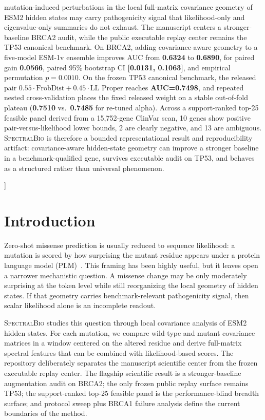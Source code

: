 \documentclass[10pt,twocolumn,letterpaper]{article}
\newcommand{\methodname}{\textsc{SpectralBio}}
\begin{document}
{\begin{center}
{mutation-induced perturbations in the local full-matrix covariance geometry of
ESM2 hidden states may carry pathogenicity signal that likelihood-only and
eigenvalue-only summaries do not exhaust. The manuscript centers a stronger-baseline
BRCA2 audit, while the public executable replay center remains the TP53 canonical
benchmark. On BRCA2, adding covariance-aware geometry to a five-model ESM-1v
ensemble improves AUC from \textbf{0.6324} to \textbf{0.6890}, for paired gain
\textbf{0.0566}, paired 95\% bootstrap CI \textbf{[0.0131, 0.1063]}, and
 empirical permutation \textbf{$p=0.0010$}. On the frozen TP53 canonical benchmark,
 the released pair \textbf{$0.55\cdot\text{FrobDist}+0.45\cdot\text{LL Proper}$}
 reaches \textbf{AUC=0.7498}, and repeated nested cross-validation places the fixed
 released weight on a stable out-of-fold plateau (\textbf{0.7510} vs.\ \textbf{0.7485}
 for re-tuned alpha). Across a support-ranked top-25 feasible panel derived from a
 15,752-gene ClinVar scan, 10 genes show positive pair-versus-likelihood lower bounds,
 2 are clearly negative, and 13 are ambiguous. \methodname{} is therefore a
 bounded representational result and reproducibility artifact: covariance-aware
 hidden-state geometry can improve a stronger baseline in a benchmark-qualified gene,
 survives executable audit on TP53, and behaves as a structured rather than universal
 phenomenon.%
}
\end{center}
\vspace{4pt}%
}]%

\section{Introduction}

Zero-shot missense prediction is usually reduced to sequence likelihood:
a mutation is scored by how surprising the mutant residue appears under a protein
language model (PLM)~\cite{meier2021language}. This framing has been highly useful,
but it leaves open a narrower mechanistic question. A missense change may be only
moderately surprising at the token level while still reorganizing the local geometry
of hidden states. If that geometry carries benchmark-relevant pathogenicity signal,
then scalar likelihood alone is an incomplete readout.

\methodname{} studies this question through local covariance analysis of ESM2 hidden
states. For each mutation, we compare wild-type and mutant covariance matrices in a
window centered on the altered residue and derive full-matrix spectral features that
can be combined with likelihood-based scores. The repository deliberately separates
the manuscript scientific center from the frozen executable replay center. The
flagship scientific result is a stronger-baseline augmentation audit on BRCA2; the
only frozen public replay surface remains TP53; the support-ranked top-25 feasible
panel is the performance-blind breadth surface; and protocol sweep plus BRCA1 failure
analysis define the current boundaries of the method.
\end{document}
